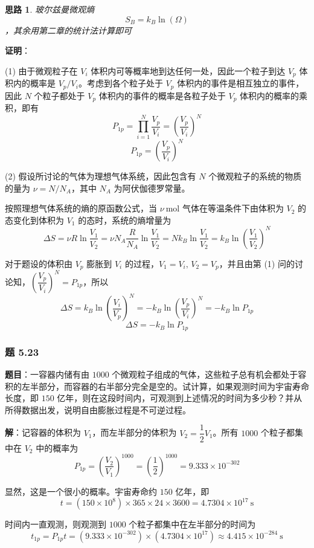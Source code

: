 \documentclass[UTF8]{ctexart}
\newtheorem{thoughts}{思路}[subsection]
\begin{document}
\begin{thoughts}
  玻尔兹曼微观熵$$S_B = k_B \ln(\Omega)$$，其余用第二章的统计法计算即可
\end{thoughts}

\textbf{证明}：

(1) 由于微观粒子在 $V_i$ 体积内可等概率地到达任何一处，因此一个粒子到达 $V_p$ 体积内的概率是 $V_p/V_i$。考虑到各个粒子处于 $V_p$ 体积内的事件是相互独立的事件，因此 $N$ 个粒子都处于 $V_p$ 体积内的事件的概率是各粒子处于 $V_p$ 体积内的概率的乘积，即有
\[
P_{1p}=\prod_{i=1}^{N}\frac{V_p}{V_i}=\left(\frac{V_p}{V_i}\right)^N
\]
\[
\boxed{P_{1p}=\left(\frac{V_p}{V_i}\right)^N}
\]

(2) 假设所讨论的气体为理想气体系统，因此包含有 $N$ 个微观粒子的系统的物质的量为 $\nu=N/N_A$，其中 $N_A$ 为阿伏伽德罗常量。

按照理想气体系统的熵的原函数公式，当 $\nu\ \mathrm{mol}$ 气体在等温条件下由体积为 $V_2$ 的态变化到体积为 $V_1$ 的态时，系统的熵增量为
\[
\Delta S=\nu R\ln\frac{V_1}{V_2}
=\nu N_A\frac{R}{N_A}\ln\frac{V_1}{V_2}
=Nk_B\ln\frac{V_1}{V_2}
=k_B\ln\left(\frac{V_1}{V_2}\right)^N
\]

对于题设的体积由 $V_p$ 膨胀到 $V_i$ 的过程，$V_1=V_i,\,V_2=V_p$，并且由第 (1) 问的讨论知，$\left(\dfrac{V_p}{V_i}\right)^N=P_{1p}$，所以
\[
\Delta S=k_B\ln\left(\frac{V_i}{V_p}\right)^N
=-k_B\ln\left(\frac{V_p}{V_i}\right)^N
=-k_B\ln P_{1p}
\]
\[
\boxed{\Delta S=-k_B\ln P_{1p}}
\]

\subsubsection{题 5.23}

\textbf{题目}：一容器内储有由 $1000$ 个微观粒子组成的气体，这些粒子总有机会都处于容积的左半部分，而容器的右半部分完全是空的。试计算，如果观测时间为宇宙寿命长度，即 $150$ 亿年，则在这段时间内，可观测到上述情况的时间为多少秒？并从所得数据出发，说明自由膨胀过程是不可逆过程。

\textbf{解}：记容器的体积为 $V_1$，而左半部分的体积为 $V_2=\dfrac{1}{2}V_1$。所有 $1000$ 个粒子都集中在 $V_2$ 中的概率为
\[
P_{1p}=\left(\frac{V_2}{V_1}\right)^{1000}
=\left(\frac{1}{2}\right)^{1000}
=9.333\times 10^{-302}
\]

显然，这是一个很小的概率。宇宙寿命约 $150$ 亿年，即
\[
t=(150\times 10^8)\times 365\times 24\times 3600
=4.7304\times 10^{17}\ \mathrm{s}
\]

时间内一直观测，则观测到 $1000$ 个粒子都集中在左半部分的时间为
\[
t_{1p}=P_{1p}t=(9.333\times 10^{-302})\times(4.7304\times 10^{17})
\approx 4.415\times 10^{-284}\ \mathrm{s}
\]
\end{document}
